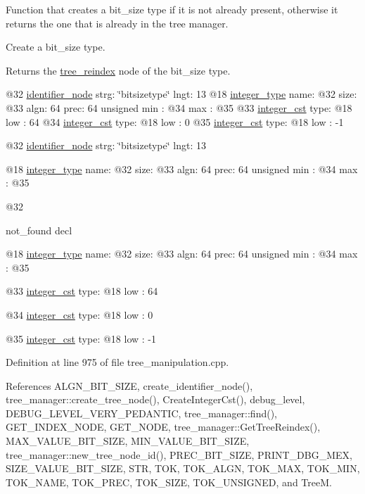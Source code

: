 Function that creates a bit\+\_\+size type if it is not already present, otherwise it returns the one that is already in the tree manager. 

Create a bit\+\_\+size type.

\begin{DoxyReturn}{Returns}
the \hyperlink{classtree__reindex}{tree\+\_\+reindex} node of the bit\+\_\+size type. 
\end{DoxyReturn}
@32 \hyperlink{structidentifier__node}{identifier\+\_\+node} strg\+: \char`\"{}bitsizetype\char`\"{} lngt\+: 13 @18 \hyperlink{structinteger__type}{integer\+\_\+type} name\+: @32 size\+: @33 algn\+: 64 prec\+: 64 unsigned min \+: @34 max \+: @35 @33 \hyperlink{structinteger__cst}{integer\+\_\+cst} type\+: @18 low \+: 64 @34 \hyperlink{structinteger__cst}{integer\+\_\+cst} type\+: @18 low \+: 0 @35 \hyperlink{structinteger__cst}{integer\+\_\+cst} type\+: @18 low \+: -\/1

@32 \hyperlink{structidentifier__node}{identifier\+\_\+node} strg\+: \char`\"{}bitsizetype\char`\"{} lngt\+: 13

@18 \hyperlink{structinteger__type}{integer\+\_\+type} name\+: @32 size\+: @33 algn\+: 64 prec\+: 64 unsigned min \+: @34 max \+: @35

@32

not\+\_\+found decl

@18 \hyperlink{structinteger__type}{integer\+\_\+type} name\+: @32 size\+: @33 algn\+: 64 prec\+: 64 unsigned min \+: @34 max \+: @35

@33 \hyperlink{structinteger__cst}{integer\+\_\+cst} type\+: @18 low \+: 64

@34 \hyperlink{structinteger__cst}{integer\+\_\+cst} type\+: @18 low \+: 0

@35 \hyperlink{structinteger__cst}{integer\+\_\+cst} type\+: @18 low \+: -\/1 

Definition at line 975 of file tree\+\_\+manipulation.\+cpp.



References A\+L\+G\+N\+\_\+\+B\+I\+T\+\_\+\+S\+I\+ZE, create\+\_\+identifier\+\_\+node(), tree\+\_\+manager\+::create\+\_\+tree\+\_\+node(), Create\+Integer\+Cst(), debug\+\_\+level, D\+E\+B\+U\+G\+\_\+\+L\+E\+V\+E\+L\+\_\+\+V\+E\+R\+Y\+\_\+\+P\+E\+D\+A\+N\+T\+IC, tree\+\_\+manager\+::find(), G\+E\+T\+\_\+\+I\+N\+D\+E\+X\+\_\+\+N\+O\+DE, G\+E\+T\+\_\+\+N\+O\+DE, tree\+\_\+manager\+::\+Get\+Tree\+Reindex(), M\+A\+X\+\_\+\+V\+A\+L\+U\+E\+\_\+\+B\+I\+T\+\_\+\+S\+I\+ZE, M\+I\+N\+\_\+\+V\+A\+L\+U\+E\+\_\+\+B\+I\+T\+\_\+\+S\+I\+ZE, tree\+\_\+manager\+::new\+\_\+tree\+\_\+node\+\_\+id(), P\+R\+E\+C\+\_\+\+B\+I\+T\+\_\+\+S\+I\+ZE, P\+R\+I\+N\+T\+\_\+\+D\+B\+G\+\_\+\+M\+EX, S\+I\+Z\+E\+\_\+\+V\+A\+L\+U\+E\+\_\+\+B\+I\+T\+\_\+\+S\+I\+ZE, S\+TR, T\+OK, T\+O\+K\+\_\+\+A\+L\+GN, T\+O\+K\+\_\+\+M\+AX, T\+O\+K\+\_\+\+M\+IN, T\+O\+K\+\_\+\+N\+A\+ME, T\+O\+K\+\_\+\+P\+R\+EC, T\+O\+K\+\_\+\+S\+I\+ZE, T\+O\+K\+\_\+\+U\+N\+S\+I\+G\+N\+ED, and TreeM.



